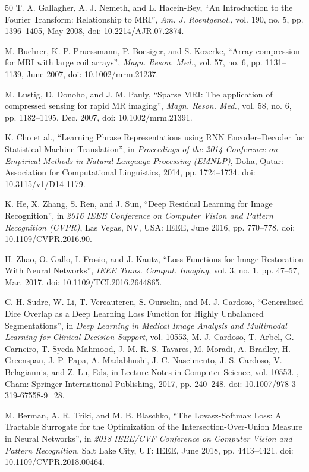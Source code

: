 \documentclass[12pt,a4paper]{article}
\begin{document}
\begin{thebibliography}{50}
T. A. Gallagher, A. J. Nemeth, and L. Hacein-Bey, ``An Introduction to the Fourier Transform: Relationship to MRI'', \textit{Am. J. Roentgenol.}, vol. 190, no. 5, pp. 1396–1405, May 2008, doi: 10.2214/AJR.07.2874.

M. Buehrer, K. P. Pruessmann, P. Boesiger, and S. Kozerke, ``Array compression for MRI with large coil arrays'', \textit{Magn. Reson. Med.}, vol. 57, no. 6, pp. 1131–1139, June 2007, doi: 10.1002/mrm.21237.

M. Lustig, D. Donoho, and J. M. Pauly, ``Sparse MRI: The application of compressed sensing for rapid MR imaging'', \textit{Magn. Reson. Med.}, vol. 58, no. 6, pp. 1182–1195, Dec. 2007, doi: 10.1002/mrm.21391.

K. Cho et al., ``Learning Phrase Representations using RNN Encoder–Decoder for Statistical Machine Translation'', in \textit{Proceedings of the 2014 Conference on Empirical Methods in Natural Language Processing (EMNLP)}, Doha, Qatar: Association for Computational Linguistics, 2014, pp. 1724–1734. doi: 10.3115/v1/D14-1179.

K. He, X. Zhang, S. Ren, and J. Sun, ``Deep Residual Learning for Image Recognition'', in \textit{2016 IEEE Conference on Computer Vision and Pattern Recognition (CVPR)}, Las Vegas, NV, USA: IEEE, June 2016, pp. 770–778. doi: 10.1109/CVPR.2016.90.

H. Zhao, O. Gallo, I. Frosio, and J. Kautz, ``Loss Functions for Image Restoration With Neural Networks'', \textit{IEEE Trans. Comput. Imaging}, vol. 3, no. 1, pp. 47–57, Mar. 2017, doi: 10.1109/TCI.2016.2644865.

C. H. Sudre, W. Li, T. Vercauteren, S. Ourselin, and M. J. Cardoso, ``Generalised Dice Overlap as a Deep Learning Loss Function for Highly Unbalanced Segmentations'', in \textit{Deep Learning in Medical Image Analysis and Multimodal Learning for Clinical Decision Support}, vol. 10553, M. J. Cardoso, T. Arbel, G. Carneiro, T. Syeda-Mahmood, J. M. R. S. Tavares, M. Moradi, A. Bradley, H. Greenspan, J. P. Papa, A. Madabhushi, J. C. Nascimento, J. S. Cardoso, V. Belagiannis, and Z. Lu, Eds, in Lecture Notes in Computer Science, vol. 10553. , Cham: Springer International Publishing, 2017, pp. 240–248. doi: 10.1007/978-3-319-67558-9\_28.

M. Berman, A. R. Triki, and M. B. Blaschko, ``The Lovasz-Softmax Loss: A Tractable Surrogate for the Optimization of the Intersection-Over-Union Measure in Neural Networks'', in \textit{2018 IEEE/CVF Conference on Computer Vision and Pattern Recognition}, Salt Lake City, UT: IEEE, June 2018, pp. 4413–4421. doi: 10.1109/CVPR.2018.00464.


\end{thebibliography}
\end{document}
